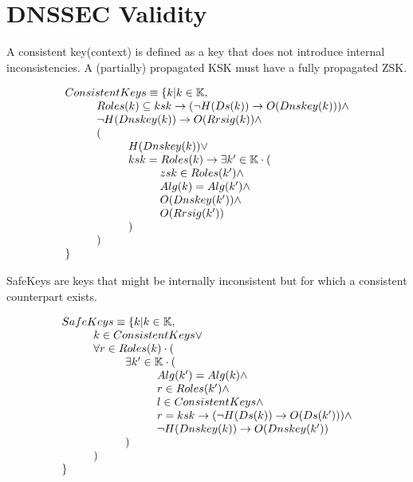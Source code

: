 \documentclass[twoside,english]{paper}
\begin{document}
\section{DNSSEC Validity}

A consistent key(context) is defined as a key that does not introduce 
internal inconsistencies. A (partially) propagated KSK must have a fully
propagated ZSK.

\begin{displaymath}
\begin{array}{l}
ConsistentKeys \equiv \{ k | k\in\mathbb{K}, \\
\hskip 1cm	Roles(k) \subseteq {ksk} \rightarrow (\neg H(Ds(k)) \rightarrow O(Dnskey(k))) \wedge \\
\hskip 1cm	\neg H(Dnskey(k)) \rightarrow O(Rrsig(k)) \wedge \\
\hskip 1cm	( \\
\hskip 2cm		H(Dnskey(k)) \vee \\
\hskip 2cm		ksk=Roles(k) \rightarrow \exists k' \in \mathbb{K} \cdot (\\
\hskip 3cm			zsk \in Roles(k') \wedge \\
\hskip 3cm			Alg(k)=Alg(k') \wedge \\
\hskip 3cm			O(Dnskey(k')) \wedge \\
\hskip 3cm			O(Rrsig(k'))\\
\hskip 2cm		)\\
\hskip 1cm	)\\
\}
\end{array}
\end{displaymath}

SafeKeys are keys that might be internally inconsistent but for which
a consistent counterpart exists.

\begin{displaymath}
\begin{array}{l}
SafeKeys \equiv \{ k | k\in\mathbb{K}, \\
\hskip 1cm 		k \in ConsistentKeys \vee \\
\hskip 1cm 		\forall r \in Roles(k) \cdot ( \\
\hskip 2cm 			\exists k' \in \mathbb{K} \cdot ( \\
\hskip 3cm 				Alg(k') = Alg(k) \wedge \\
\hskip 3cm 				r \in Roles(k') \wedge \\
\hskip 3cm 				l \in ConsistentKeys \wedge \\
\hskip 3cm 				r = ksk \rightarrow (\neg H(Ds(k)) \rightarrow O(Ds(k'))) \wedge \\
\hskip 3cm 				\neg H(Dnskey(k)) \rightarrow O(Dnskey(k')) \\
\hskip 2cm 			)\\
\hskip 1cm 		)\\
\}
\end{array}
\end{displaymath}
\end{document}

